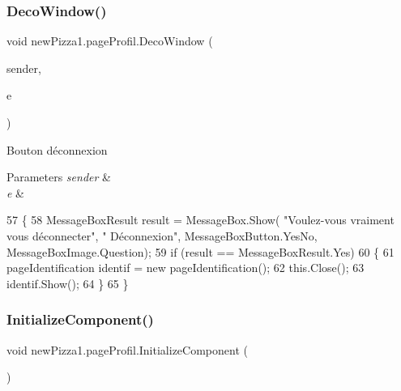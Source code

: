\subsubsection{\texorpdfstring{Deco\+Window()}{DecoWindow()}}
{\footnotesize\ttfamily void new\+Pizza1.\+page\+Profil.\+Deco\+Window (\begin{DoxyParamCaption}\item[{object}]{sender,  }\item[{Routed\+Event\+Args}]{e }\end{DoxyParamCaption})\hspace{0.3cm}{\ttfamily [inline]}}



Bouton déconnexion 


\begin{DoxyParams}{Parameters}
{\em sender} & \\
\hline
{\em e} & \\
\hline
\end{DoxyParams}

\begin{DoxyCode}
57         \{
58             MessageBoxResult result = MessageBox.Show( \textcolor{stringliteral}{"Voulez-vous vraiment vous  déconnecter"}, \textcolor{stringliteral}{"
      Déconnexion"}, MessageBoxButton.YesNo, MessageBoxImage.Question);
59             \textcolor{keywordflow}{if} (result == MessageBoxResult.Yes)
60             \{
61                 pageIdentification identif = \textcolor{keyword}{new} pageIdentification();
62                 this.Close();
63                 identif.Show();
64             \}
65         \}
\end{DoxyCode}
\mbox{\label{classnewPizza1_1_1pageProfil_a53ca6e755a62dfda0434ae88b7355d3e}} 
\subsubsection{\texorpdfstring{Initialize\+Component()}{InitializeComponent()}\hspace{0.1cm}{\footnotesize\ttfamily [1/3]}}
{\footnotesize\ttfamily void new\+Pizza1.\+page\+Profil.\+Initialize\+Component (\begin{DoxyParamCaption}{ }\end{DoxyParamCaption})\hspace{0.3cm}{\ttfamily [inline]}}




